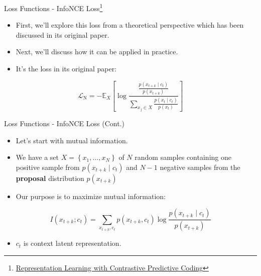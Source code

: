 \documentclass[serif, aspectratio=169]{beamer}
\begin{document}
 \begin{frame}{Loss Functions - InfoNCE Loss\footnote{\href{https://arxiv.org/pdf/1807.03748v2}{Representation Learning with Contrastive Predictive Coding}}}
     \begin{itemize}
         \item First, we'll explore this loss from a theoretical perspective which has been discussed in its original paper.
         \item Next, we'll discuss how it can be applied in practice.
         \item It's the loss in its original paper:
     \end{itemize}

     \begin{equation*}
         \mathcal{L}_{\mathrm{N}}=-{\mathbb{E}_X}\left[\log \frac
         {\frac{p\left(x_{t+k} \mid c_t\right)}{p\left(x_{t+k}\right)}}
         {\sum_{x_j \in X} \frac{p\left(x_{t} \mid c_t\right)}{p\left(x_{t}\right)}}
         \right]
     \end{equation*}
 \end{frame}


\begin{frame}{Loss Functions - InfoNCE Loss (Cont.)}
     \begin{itemize}
         \item Let's start with mutual information.
         \item We have a set $X=\left\{x_1, \ldots, x_N\right\}$ of $N$ random samples containing one positive sample from $p\left(x_{t+k} \mid c_t\right)$ and $N - 1$ negative samples from the \textbf{proposal} distribution $p\left(x_{t+k}\right)$
         \item Our purpose is to maximize mutual information:
     \end{itemize}

     \begin{equation*}
         I(x_{t+k}; c_t)=\sum_{x_{t+k}, c_t} p(x_{t+k}, c_t) \log \frac{p(x_{t+k} \mid c_t)}{p(x_{t+k})}
     \end{equation*}

     \begin{itemize}
         \item $c_t$ is context latent representation.
     \end{itemize}
\end{frame}
\end{document}
